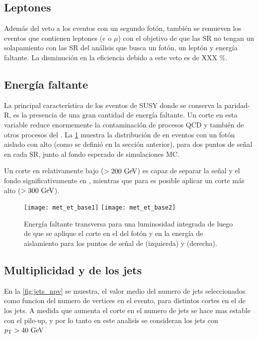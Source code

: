 \subsection{Leptones}\label{sec:leptonphoton_veto}

Además del veto a los eventos con un segundo fotón, también se remueven
los eventos que contienen leptones ($e$ o $\mu$) con el objetivo de que las
SR no tengan un solapamiento con las SR del análisis que busca un fotón, un
leptón y energía faltante. La disminución en la eficiencia
debido a este veto es de XXX \%.



\subsection{Energía faltante}

La principal característica de los eventos de SUSY donde se conserva
la paridad-R, es la presencia de una gran cantidad de energía faltante.
Un corte en esta variable reduce enormemente la contaminación de procesos
QCD y también de otros procesos del {\SM}.
La \cref{fig:opt_met} muestra la distribución de {\met} en eventos con
un fotón aislado con alto {\pt} (como se definió en la sección anterior),
para dos puntos de señal en cada SR, junto al fondo esperado de simulaciones
MC.

Un corte en {\met} relativamente bajo ($> 200 \gev$) es capaz de separar
la señal y el fondo significativamente en {\SRL}, mientras que para {\SRH}
es posible aplicar un corte más alto ($>300\gev$).

\begin{figure}[!htbp]
  \centering
  \texttt{[image: met\_et\_base1]}
  \texttt{[image: met\_et\_base2]}
  \caption{Energía faltante transversa para una luminosidad integrada de {\ilumi}
    luego de que se aplique el corte en el {\pt} del fotón y en la energía de aislamiento
    para los puntos de señal de {\SRL} (izquierda) y {\SRH} (derecha). }
  \label{fig:opt_met}
\end{figure}



\subsection{Multiplicidad y {\pt} de los jets} \label{sec:opt_njet}

En la \cref{fig:jets_npv} se muestra, el valor medio del numero de jets
seleccionados como funcion del numero de vertices en el evento, para
distintos cortes en el {\pt} de los jets. A medida que aumenta el corte
en {\pt} el numero de jets se hace mas estable con el pile-up, y por lo
tanto en este analisis se consideran los jets con $\pt>40\gev$

